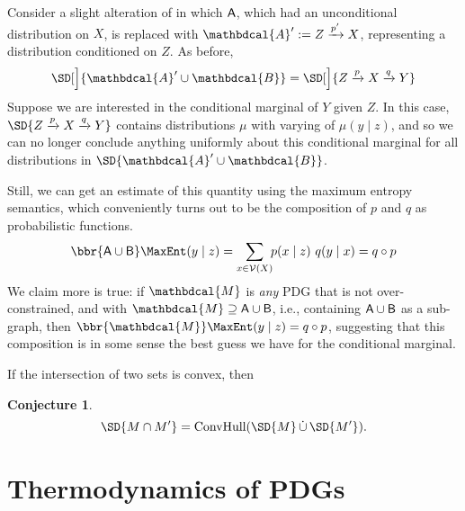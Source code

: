 \documentclass[letterpaper]{article} %
\theoremstyle{plain}
\newtheorem{conj}[theorem]{Conjecture}
\theoremstyle{definition}
\theoremstyle{remark}
\newcommand{\V}{\mathcal V}
\newcommand{\dg}[1]{\mathbdcal{#1}}
\begin{document}
\begin{vfull}
\begin{example}[composition]
	Consider a slight alteration of  in which $\sf A$, which had an unconditional distribution on $X$, is replaced with $\dg A' := Z \xrightarrow{p'} X$, representing a distribution conditioned on $Z$. 
	As before,
	\[ \SD[\Big]{{\dg A' \cup \dg B}} = \SD[\Big]{{Z} \xrightarrow{p} X \xrightarrow{q} Y} \]
	Suppose we are interested in the conditional marginal of $Y$ given $Z$. In this case, $\SD{{Z} \xrightarrow{p} X \xrightarrow{q} Y} $ contains distributions $\mu$ with varying of $\mu(y \mid z)$, and so we can no longer conclude anything uniformly about this conditional marginal for all distributions in $\SD{{\dg A' \cup \dg B}}$. 
	
	Still, we can get an estimate of this quantity using the maximum entropy semantics, which conveniently turns out to be the composition of $p$ and $q$ as probabilistic functions.
	$$ \bbr{{\sf A \cup B}}\MaxEnt(y \mid z) = \sum_{x \in \V(X)}\!\! p (x \mid z)\ q(y \mid x) = q \circ p $$
	We claim more is true: if $\dg M$ is \emph{any} PDG that is not over-constrained, and with $\dg M \supseteq \sf A \cup B$, i.e., containing $\sf A \cup B$ as a sub-graph, then
	$ \bbr{\dg M}\MaxEnt(y \mid z) = q \circ p$,
	suggesting that this composition is in some sense the best guess we have for the conditional marginal. 
\end{example}

\begin{vleftovers}
If the intersection of two sets is convex, then 
\begin{conj}\label{prop:intersect-set-semantics}
	\[ \SD{M \cap M'} = \text{ConvHull}(\SD{M} \mathop{\dot\cup} \SD{M'}).\]
\end{conj}
\end{vleftovers}
\end{vfull}

\section{Thermodynamics of PDGs}\label{sec:thermo}
\end{document}
